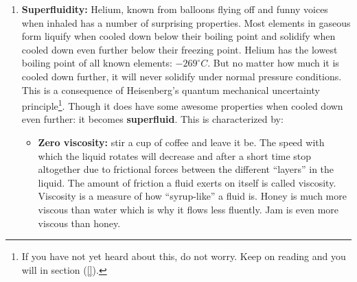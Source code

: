 \begin{enumerate}
\noindent Superconductivity was first discovered in solid mercury which was cooled down to approximately $-269^{\circ}C$ (which is $4^{\circ}C$ above absolute zero). A theory known as BCS-theory (after Bardeen, Cooper and Schrieffer who proposed it) was later developed to explain/describe the underlying, microscopic workings of it. The mechanism described in BCS only works for very low temperatures and according to it, no superconductive behavior should be present above around $-240^{\circ} C$.. But in the 1980's a "`high-temperature superconductor"' was discovered\footnote{High temperature is of course a relative concept, because we are still talking about $-180^{\circ} C$. This is way warmer than the original superconductors. Though still rather cold in my own humble opinion.}. The mechanism causing superconductivity at "`high"' temperatures is as yet unknown. It is possible that BCS is correct for low-temperature superconductivity and that a completely different mechanism causes its high-temperature counterpart. Alternatively, it could be wrong or at least incomplete even for the low-temperature ones. The question of the causes of high-temperature superconductivity remains open for now.

\item \textbf{Superfluidity: }Helium, known from balloons flying off and funny voices when inhaled has a number of surprising properties. Most elements in gaseous form liquify when cooled down below their boiling point and solidify when cooled down even further below their freezing point. Helium has the lowest boiling point of all known elements: $-269^{\circ} C$. But no matter how much it is cooled down further, it will never solidify under normal pressure conditions. This is a consequence of Heisenberg's quantum mechanical uncertainty principle\footnote{If you have not yet heard about this, do not worry. Keep on reading and you will in section (\ref{}).}. Though it does have some awesome properties when cooled down even further: it becomes \textbf{superfluid}. This is characterized by:
\begin{itemize}
\item \textbf{Zero viscosity: }stir a cup of coffee and leave it be. The speed with which the liquid rotates will decrease and after a short time stop altogether due to frictional forces between the different "`layers"' in the liquid. The amount of friction a fluid exerts on itself is called viscosity. Viscosity is a measure of how "`syrup-like"' a fluid is. Honey is much more viscous than water which is why it flows less fluently. Jam is even more viscous than honey.\\


\end{itemize}
\end{enumerate}

